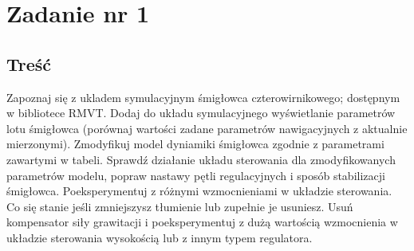 \documentclass[polish,11pt,a4paper]{article}
\begin{document}
\section*{Zadanie nr 1}
\subsection*{Treść}
Zapoznaj się z ukladem symulacyjnym śmigłowca czterowirnikowego; dostępnym
w bibliotece RMVT. Dodaj do układu symulacyjnego wyświetlanie parametrów lotu śmigłowca 
(porównaj wartości zadane parametrów nawigacyjnych z aktualnie mierzonymi). Zmodyfikuj
model dyniamiki śmigłowca zgodnie z parametrami zawartymi w tabeli. Sprawdź działanie układu
sterowania dla zmodyfikowanych parametrów modelu, popraw nastawy pętli regulacyjnych i sposób
stabilizacji śmigłowca. Poeksperymentuj z różnymi wzmocnieniami w układzie sterowania. Co się 
stanie jeśli zmniejszysz tłumienie lub zupełnie je usuniesz. Usuń kompensator siły grawitacji
i poeksperymentuj z dużą wartością wzmocnienia w układzie sterowania wysokością lub z innym 
typem regulatora.
\end{document}
